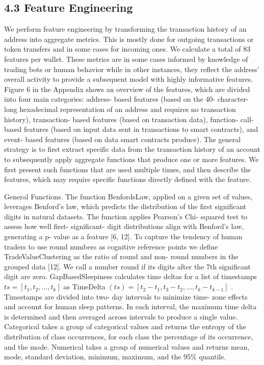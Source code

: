 \subsection*{4.3 Feature Engineering}

We perform feature engineering by transforming the transaction history of an address into aggregate metrics. This is mostly done for outgoing transactions or token transfers and in some cases for incoming ones. We calculate a total of 83 features per wallet. These metrics are in some cases informed by knowledge of trading bots or human behavior while in other instances, they reflect the address' overall activity to provide a subsequent model with highly informative features. Figure 6 in the Appendix shows an overview of the features, which are divided into four main categories: address- based features (based on the 40- character- long hexadecimal representation of an address and requires no transaction history), transaction- based features (based on transaction data), function- call- based features (based on input data sent in transactions to smart contracts), and event- based features (based on data smart contracts produce). The general strategy is to first extract specific data from the transaction history of an account to subsequently apply aggregate functions that produce one or more features. We first present such functions that are used multiple times, and then describe the features, which may require specific functions directly defined with the feature.

General Functions. The function BenfordsLaw, applied on a given set of values, leverages Benford's law, which predicts the distribution of the first significant digits in natural datasets. The function applies Pearson's Chi- squared test to assess how well first- significant- digit distributions align with Benford's law, generating a p- value as a feature [6, 12]. To capture the tendency of human traders to use round numbers as cognitive reference points we define TradeValueClustering as the ratio of round and non- round numbers in the grouped data [12]. We call a number round if its digits after the 7th significant digit are zero. GapBasedSleepiness calculates time deltas for a list of timestamps \(t s = [t_{1},t_{2},\ldots ,t_{k}]\) as TimeDelta \((t s) = [t_{2} - t_{1},t_{3} - t_{2},\ldots ,t_{k} - t_{k - 1}]\) . Timestamps are divided into two- day intervals to minimize time- zone effects and account for human sleep patterns. In each interval, the maximum time delta is determined and then averaged across intervals to produce a single value. Categorical takes a group of categorical values and returns the entropy of the distribution of class occurrences, for each class the percentage of its occurrence, and the mode. Numerical takes a group of numerical values and returns mean, mode, standard deviation, minimum, maximum, and the 95\% quantile.

